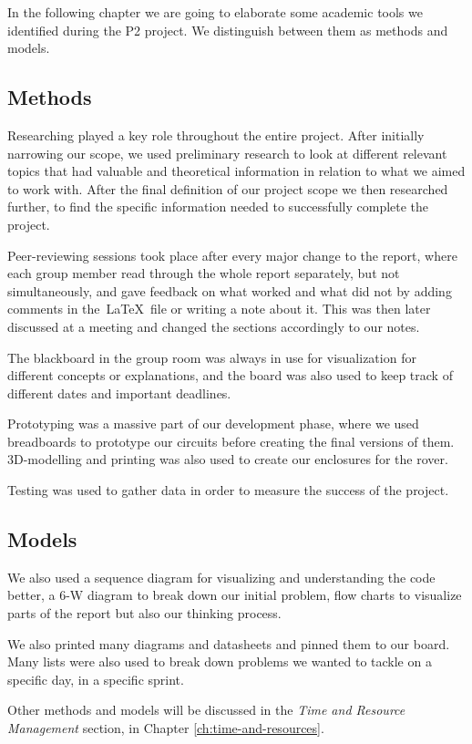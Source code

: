 In the following chapter we are going to elaborate some academic tools we identified during the P2 project. We distinguish between them as methods and models. 

\subsection{Methods}
Researching played a key role throughout the entire project. After initially narrowing our scope, we used preliminary research to look at different relevant topics that had valuable and theoretical information in relation to what we aimed to work with. After the final definition of our project scope we then researched further, to find the specific information needed to successfully complete the project.

Peer-reviewing sessions took place after every major change to the report, where each group member read through the whole report separately, but not simultaneously, and gave feedback on what worked and what did not by adding comments in the~\LaTeX ~file or writing a note about it. This was then later discussed at a meeting and changed the sections accordingly to our notes.

The blackboard in the group room was always in use for visualization for different concepts or explanations, and the board was also used to keep track of different dates and important deadlines.

Prototyping was a massive part of our development phase, where we used breadboards to prototype our circuits before creating the final versions of them. 3D-modelling and printing was also used to create our enclosures for the rover.

Testing was used to gather data in order to measure the success of the project.

\subsection{Models}
We also used a sequence diagram for visualizing and understanding the code better, a 6-W diagram to break down our initial problem, flow charts to visualize parts of the report but also our thinking process.

We also printed many diagrams and datasheets and pinned them to our board. Many lists were also used to break down problems we wanted to tackle on a specific day, in a specific sprint.

Other methods and models will be discussed in the \textit{Time and Resource Management} section, in Chapter \ref{ch:time-and-resources}.

